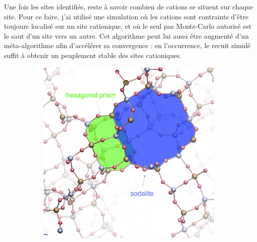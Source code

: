 \documentclass[thesis]{subfiles}
\begin{document}
\begin{otherlanguage}{french}
Une fois les sites identifiés, reste à savoir combien de cations se situent sur chaque site. Pour ce faire, j'ai utilisé une simulation où les cations sont contraints d'être toujours localisé sur un site cationique, et où le seul pas Monte-Carlo autorisé est le saut d'un site vers un autre. Cet algorithme peut lui aussi être augmenté d'un méta-algorithme afin d'accélérer sa convergence : en l'occurrence, le recuit simulé suffit à obtenir un peuplement stable des sites cationiques.

\begin{figure}[ht]
	\centering
	\hfill\begin{subfigure}{0.45\columnwidth}
		\centering
		\includegraphics[width=0.95\columnwidth]{figures/cations/FAU1_cages_text.jpg}
	\end{subfigure}\hfill%
	\begin{subfigure}{0.45\columnwidth}
		\centering

\end{subfigure}
\end{figure}
\end{otherlanguage}
\end{document}
